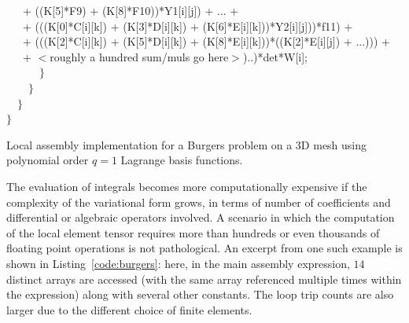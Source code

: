 \begin{algorithm}[thpb]
~~~+ ((K[5]*F9) + (K[8]*F10))*Y1[i][j]) + ... + \\
~~~+ (((K[0]*C[i][k]) + (K[3]*D[i][k]) + (K[6]*E[i][k]))*Y2[i][j]))*f11) + \\
~~~+ (((K[2]*C[i][k]) + (K[5]*D[i][k]) + (K[8]*E[i][k]))*((K[2]*E[i][j]) + ...))) + \\
~~~+ $<$roughly a hundred sum/muls go here$>$)..)*det*W[i];\\
~~~~~~$\rbrace$\\
~~~~$\rbrace$\\
~~$\rbrace$ \\
$\rbrace$
\caption{Local assembly implementation for a Burgers problem on a 3D mesh using polynomial order $q=1$ Lagrange basis functions.}
\label{code:burgers}
\end{algorithm}

The evaluation of integrals becomes more computationally expensive if the complexity of the variational form grows, in terms of number of coefficients and differential or algebraic operators involved. A scenario in which the computation of the local element tensor requires more than hundreds or even thousands of floating point operations is not pathological. An excerpt from one such example is shown in Listing~\ref{code:burgers}: here, in the main assembly expression, $14$ distinct arrays are accessed (with the same array referenced multiple times within the expression) along with several other constants. The loop trip counts are also larger due to the different choice of finite elements. 

%
%


